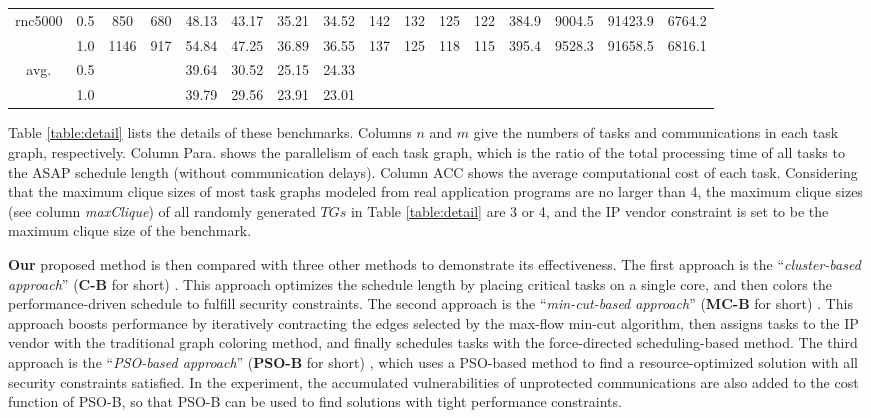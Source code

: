 \documentclass[10pt,journal, compsoc]{IEEEtran}
\begin{document}
\begin{table}[!t]
\begin{tabular}{c|c|c|c|cccc|cccc|cccc}
\multicolumn{1}{c|}{\multirow{2}{*}{rnc5000}}       &0.5 &850  &680  &48.13    &43.17  &35.21  &34.52    &142    &132  &125  &122    &384.9     &9004.5  &91423.9  &6764.2             \\
                                                    &1.0 &1146 &917  &54.84    &47.25  &36.89  &36.55    &137    &125  &118  &115    &395.4     &9528.3  &91658.5  &6816.1            \\

\hline
\multicolumn{1}{c|}{\multirow{2}{*}{avg.}}       &0.5 &      &  &39.64  &30.52  &25.15    &24.33   &  & &  &   & &  &         \\
                                                 &1.0 &     &  &39.79  &29.56   &23.91   &23.01  & &  &  & &   &    &     \\
\hline
\hline
\end{tabular}
\label{table:PCTS_R}
\end{table}

Table \ref{table:detail} lists the details of these benchmarks. Columns $n$ and $m$ give the numbers of tasks and communications in each task graph, respectively. Column Para. shows the parallelism of each task graph, which is the ratio of the total processing time of all tasks to the ASAP schedule length (without communication delays). Column ACC shows the average computational cost of each task. Considering that the maximum clique sizes of most task graphs modeled from real application programs are no larger than 4\cite{article:CL}, the maximum clique sizes (see column \textit{maxClique}) of all randomly generated $TGs$ in Table \ref{table:detail} are 3 or 4, and the IP vendor constraint is set to be the maximum clique size of the benchmark.


\textbf{Our} proposed method is then compared with three other methods to demonstrate its effectiveness. The first approach is the ``\textit{cluster-based approach}'' (\textbf{C-B} for short) \cite{article:CL}. This approach optimizes the schedule length by placing critical tasks on a single core, and then colors the performance-driven schedule to fulfill security constraints. The second approach is the ``\textit{min-cut-based approach}'' (\textbf{MC-B} for short) \cite{article:NW}. This approach boosts performance by iteratively contracting the edges selected by the max-flow min-cut algorithm, then assigns tasks to the IP vendor with the traditional graph coloring method, and finally schedules tasks with the force-directed scheduling-based method. The third approach is the ``\textit{PSO-based approach}'' (\textbf{PSO-B} for short) \cite{article:SR}, which uses a PSO-based method to find a resource-optimized solution with all security constraints satisfied. In the experiment, the accumulated vulnerabilities of unprotected communications are also added to the cost function of PSO-B, so that PSO-B can be used to find solutions with tight performance constraints.
\end{document}
